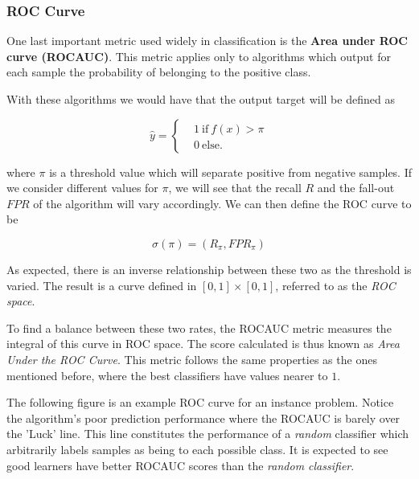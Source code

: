 \subsubsection{ROC Curve}

One last important metric used widely in classification is the  \textbf{Area under ROC curve (ROCAUC)}. This metric applies only to algorithms which output for each sample  the probability of belonging to the positive class.  

With these algorithms we would have that the output target will be defined as

\begin{equation}
\hat{y} =
\begin{cases}
&1 \ \mbox{if} \  f(x) > \pi \\
&0 \ \mbox{else}.
\end{cases}
\end{equation}

where $\pi$ is a threshold value which will separate positive from negative samples. If we consider different values for $\pi$, we will see that the recall $R$ and the fall-out $FPR$ of the algorithm will vary accordingly. We can then define the ROC curve to be 

\begin{equation}
\sigma(\pi) = (R_\pi, FPR_\pi)
\end{equation}

As expected, there is an inverse relationship between these two as the threshold is varied. The result is a curve defined in $[0,1]\times[0,1]$, referred to as the \textit{ROC space}.

To find a balance between these two rates, the ROCAUC metric measures the integral of this curve in ROC space. The score  calculated is thus known as \textit{Area Under the ROC Curve}. This metric follows the same properties as the ones mentioned before, where the best classifiers have values nearer to $1$.

The following figure is an example ROC curve for an instance problem. Notice the algorithm's poor prediction performance where the ROCAUC is barely over the 'Luck' line. This line constitutes the performance of a \textit{random} classifier which arbitrarily labels samples as being to each possible class. It is expected to see good learners have better ROCAUC scores than the \textit{random classifier}.

